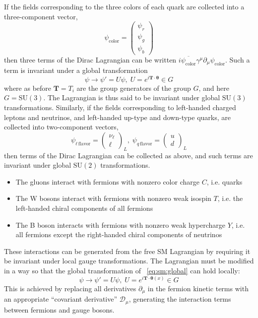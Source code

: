 If the fields corresponding to the three colors of each quark are collected into a three-component vector,
\begin{equation}
  \psi_\text{color} = \begin{pmatrix}\psi_r\\\psi_g\\\psi_b\end{pmatrix}
  \label{eq:sm:color}
\end{equation}
then three terms of the Dirac Lagrangian can be written $i\overline{\psi_\text{color}}\gamma^\mu\partial_\mu\psi_\text{color}$.
Such a term is invariant under a global transformation
\begin{equation}
  \psi \to \psi' = U\psi,\; U = e^{i\mathbf{T}\cdot\bm{\theta}} \in G
  \label{eq:sm:global}
\end{equation}
where as before $\mathbf{T} = T_i$ are the group generators of the group $G$, and here $G = \mathrm{SU}(3)$.
The Lagrangian is thus said to be invariant under global $\mathrm{SU}(3)$ transformations.
Similarly, if the fields corresponding to left-handed charged leptons and neutrinos, and left-handed up-type and down-type quarks, are collected into two-component vectors,
\begin{equation}
  \psi_{\ell\,\text{flavor}} = \begin{pmatrix}\nu_\ell\\\ell\end{pmatrix}_L,\; \psi_{q\,\text{flavor}} = \begin{pmatrix}u\\d\end{pmatrix}_L
  \label{eq:sm:su2}
\end{equation}
then terms of the Dirac Lagrangian can be collected as above, and such terms are invariant under global $\mathrm{SU}(2)$ transformations.

\begin{itemize}
  \item The gluons interact with fermions with nonzero color charge $C$, i.e. quarks
  \item The W bosons interact with fermions with nonzero weak isospin $T$, i.e. the left-handed chiral components of all fermions
  \item The B boson interacts with fermions with nonzero weak hypercharge $Y$, i.e. all fermions except the right-handed chiral components of neutrinos
\end{itemize}

These interactions can be generated from the free SM Lagrangian by requiring it be invariant under local gauge transformations.
The Lagrangian must be modified in a way so that the global transformation of \Eq~\ref{eq:sm:global} can hold locally:
\begin{equation}
  \psi \to \psi' = U\psi,\; U = e^{i\mathbf{T}\cdot\bm{\theta}(x)} \in G
  \label{eq:sm:local}
\end{equation}
This is achieved by replacing all derivatives $\partial_\mu$ in the fermion kinetic terms with an appropriate ``covariant derivative'' $\mathcal{D}_\mu$, generating the interaction terms between fermions and gauge bosons.

